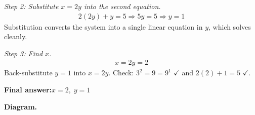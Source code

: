 \documentclass[11pt]{article}
\begin{document}
\textit{Step 2: Substitute \( x = 2y \) into the second equation.}
\[\begin{gathered}
2(2y) + y = 5 \Rightarrow 5y = 5 \Rightarrow y = 1
\end{gathered}\]
Substitution converts the system into a single linear equation in \( y \), which solves cleanly.

\textit{Step 3: Find \( x \).}
\[\begin{gathered}
x = 2y = 2
\end{gathered}\]
Back-substitute \( y = 1 \) into \( x = 2y \). Check: \( 3^2 = 9 = 9^1 \) $\checkmark$ and \( 2(2) + 1 = 5 \) $\checkmark$.

\begin{answerbox}
\textbf{Final answer:}\quad \(\displaystyle  x = 2, \; y = 1 \)
\end{answerbox}
\textbf{Diagram.}
\end{document}
